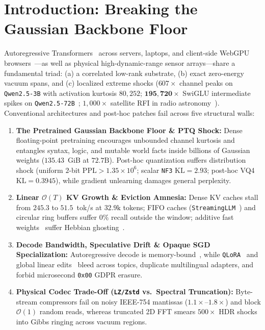 \documentclass[10pt,twocolumn]{article}
\begin{document}
\section{Introduction: Breaking the Gaussian Backbone Floor}
Autoregressive Transformers~\citep{vaswani2017attention} across servers, laptops, and client-side WebGPU browsers~\citep{w3c2024webgpu}---as well as physical high-dynamic-range sensor arrays---share a fundamental triad: (a) a correlated low-rank substrate, (b) exact zero-energy vacuum spans, and (c) localized extreme shocks ($607\times$ channel peaks on \texttt{Qwen2.5-3B} with activation kurtosis $80{,}252$; $\mathbf{195{,}720\times}$ SwiGLU intermediate spikes on \texttt{Qwen2.5-72B}~\citep{dettmers2022llmint8,lin2024awq}; $1{,}000\times$ satellite RFI in radio astronomy~\citep{leshem2000multichannel}). Conventional architectures and post-hoc patches fail across five structural walls:
\begin{enumerate}
    \item \textbf{The Pretrained Gaussian Backbone Floor \& PTQ Shock:} Dense floating-point pretraining encourages unbounded channel kurtosis and entangles syntax, logic, and mutable world facts inside billions of Gaussian weights ($135.43$~GiB at $72.7\text{B}$). Post-hoc quantization suffers distribution shock (uniform $2$-bit $\mathrm{PPL} > 1.35\times 10^6$; scalar \texttt{NF3} $\mathrm{KL}=2.93$; post-hoc VQ4 $\mathrm{KL}=0.3945$), while gradient unlearning damages general perplexity.
    \item \textbf{Linear $\mathcal{O}(T)$ KV Growth \& Eviction Amnesia:} Dense KV caches stall from $245.3$ to $51.5$~tok/s at $32.9\text{k}$ tokens; FIFO caches (\texttt{StreamingLLM}~\citep{xiao2024efficient}) and circular ring buffers suffer $0\%$ recall outside the window; additive fast weights~\citep{schmidhuber1992learning} suffer Hebbian ghosting~\citep{schlag2021linear,yang2024parallelizing}.
    \item \textbf{Decode Bandwidth, Speculative Drift \& Opaque SGD Specialization:} Autoregressive decode is memory-bound~\citep{leviathan2023fast}, while \texttt{QLoRA}~\citep{dettmers2023qlora} and global linear edits~\citep{meng2022locating,fang2025alphaedit} bleed across topics, duplicate multilingual adapters, and forbid microsecond \texttt{0x00} GDPR erasure.
    \item \textbf{Physical Codec Trade-Off (\texttt{LZ/Zstd} vs.\ Spectral Truncation):} Byte-stream compressors fail on noisy IEEE-754 mantissas ($1.1\times$--$1.8\times$) and block $\mathcal{O}(1)$ random reads, whereas truncated 2D FFT smears $500\times$ HDR shocks into Gibbs ringing across vacuum regions.
\end{enumerate}
\end{document}

